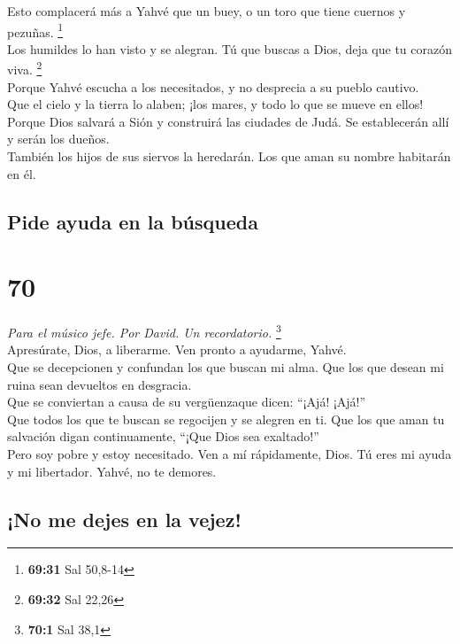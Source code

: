  Esto complacerá más a Yahvé que un buey, o un toro que
tiene cuernos y pezuñas. \footnote{\textbf{69:31} Sal 50,8-14}\\
 Los humildes lo han visto y se alegran. Tú que buscas a
Dios, deja que tu corazón viva. \footnote{\textbf{69:32} Sal 22,26}\\
 Porque Yahvé escucha a los necesitados, y no desprecia a
su pueblo cautivo.\\
 Que el cielo y la tierra lo alaben; ¡los mares, y todo
lo que se mueve en ellos!\\
 Porque Dios salvará a Sión y construirá las ciudades de
Judá. Se establecerán allí y serán los dueños.\\
 También los hijos de sus siervos la heredarán. Los que
aman su nombre habitarán en él.

\hypertarget{pide-ayuda-en-la-buxfasqueda}{%
\subsection{Pide ayuda en la
búsqueda}\label{pide-ayuda-en-la-buxfasqueda}}

\hypertarget{section-68}{%
\section{70}\label{section-68}}

\emph{Para el músico jefe. Por David. Un recordatorio.} \footnote{\textbf{70:1}
  Sal 38,1}\\
 Apresúrate, Dios, a liberarme. Ven pronto a ayudarme,
Yahvé.\\
 Que se decepcionen y confundan los que buscan mi alma.
Que los que desean mi ruina sean devueltos en desgracia.\\
 Que se conviertan a causa de su vergüenzaque dicen:
``¡Ajá! ¡Ajá!''\\
 Que todos los que te buscan se regocijen y se alegren en
ti. Que los que aman tu salvación digan continuamente, ``¡Que Dios sea
exaltado!''\\
 Pero soy pobre y estoy necesitado. Ven a mí rápidamente,
Dios. Tú eres mi ayuda y mi libertador. Yahvé, no te demores.

\hypertarget{no-me-dejes-en-la-vejez}{%
\subsection{¡No me dejes en la vejez!}\label{no-me-dejes-en-la-vejez}}

